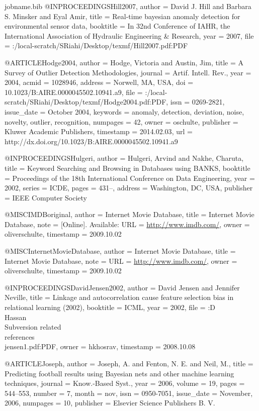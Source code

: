 {\begin{filecontents*}{jobname.bib}
	@INPROCEEDINGS{Hill2007,
		author = {David J. Hill and Barbara S. Minsker and Eyal Amir},
		title = {Real-time bayesian anomaly detection for environmental sensor data},
		booktitle = {In 32nd Conference of IAHR, the International Association of Hydraulic
			Engineering \& Research},
		year = {2007},
		file = {:/local-scratch/SRiahi/Desktop/texmf/Hill2007.pdf:PDF}
	}
	
	@ARTICLE{Hodge2004,
		author = {Hodge, Victoria and Austin, Jim},
		title = {A Survey of Outlier Detection Methodologies},
		journal = {Artif. Intell. Rev.},
		year = {2004},
		acmid = {1028946},
		address = {Norwell, MA, USA},
		doi = {10.1023/B:AIRE.0000045502.10941.a9},
		file = {:/local-scratch/SRiahi/Desktop/texmf/Hodge2004.pdf:PDF},
		issn = {0269-2821},
		issue_date = {October 2004},
		keywords = {anomaly, detection, deviation, noise, novelty, outlier, recognition},
		numpages = {42},
		owner = {oschulte},
		publisher = {Kluwer Academic Publishers},
		timestamp = {2014.02.03},
		url = {http://dx.doi.org/10.1023/B:AIRE.0000045502.10941.a9}
	}
	
	@INPROCEEDINGS{Hulgeri,
		author = {Hulgeri, Arvind and Nakhe, Charuta},
		title = {Keyword Searching and Browsing in Databases using BANKS},
		booktitle = {Proceedings of the 18th International Conference on Data Engineering},
		year = {2002},
		series = {ICDE},
		pages = {431--},
		address = {Washington, DC, USA},
		publisher = {IEEE Computer Society}
	}
	
	@MISC{IMDBoriginal,
		author = {{Internet Movie Database}},
		title = {Internet Movie Database},
		note = {[Online]. Available: URL = \url{http://www.imdb.com/}},
		owner = {oliverschulte},
		timestamp = {2009.10.02}
	}
	
	@MISC{InternetMovieDatabase,
		author = {{Internet Movie Database}},
		title = {Internet Movie Database},
		note = {URL = \url{http://www.imdb.com/}},
		owner = {oliverschulte},
		timestamp = {2009.10.02}
	}
	
	@INPROCEEDINGS{DavidJensen2002,
		author = {David Jensen and Jennifer Neville},
		title = {Linkage and autocorrelation cause feature selection bias in relational
			learning (2002)},
		booktitle = {ICML},
		year = {2002},
		file = {:D\:\\Hassan\\Subversion related\\references\\jensen1.pdf:PDF},
		owner = {hkhosrav},
		timestamp = {2008.10.08}
	}
	
	@ARTICLE{Joseph,
		author = {Joseph, A. and Fenton, N. E. and Neil, M.},
		title = {Predicting football results using Bayesian nets and other machine
			learning techniques},
		journal = {Know.-Based Syst.},
		year = {2006},
		volume = {19},
		pages = {544--553},
		number = {7},
		month = nov,
		issn = {0950-7051},
		issue_date = {November, 2006},
		numpages = {10},
		publisher = {Elsevier Science Publishers B. V.}
	}
	

\end{filecontents*}}
